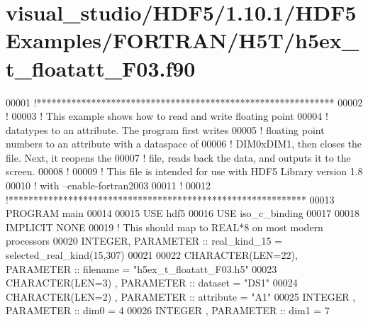 \hypertarget{visual__studio_2_h_d_f5_21_810_81_2_h_d_f5_examples_2_f_o_r_t_r_a_n_2_h5_t_2h5ex__t__floatatt___f03_8f90_source}{}\section{visual\+\_\+studio/\+H\+D\+F5/1.10.1/\+H\+D\+F5\+Examples/\+F\+O\+R\+T\+R\+A\+N/\+H5\+T/h5ex\+\_\+t\+\_\+floatatt\+\_\+\+F03.f90}
\label{visual__studio_2_h_d_f5_21_810_81_2_h_d_f5_examples_2_f_o_r_t_r_a_n_2_h5_t_2h5ex__t__floatatt___f03_8f90_source}

\begin{DoxyCode}
00001 \textcolor{comment}{!************************************************************}
00002 \textcolor{comment}{!}
00003 \textcolor{comment}{!  This example shows how to read and write floating point}
00004 \textcolor{comment}{!  datatypes to an attribute.  The program first writes}
00005 \textcolor{comment}{!  floating point numbers to an attribute with a dataspace of}
00006 \textcolor{comment}{!  DIM0xDIM1, then closes the file.  Next, it reopens the}
00007 \textcolor{comment}{!  file, reads back the data, and outputs it to the screen.}
00008 \textcolor{comment}{!}
00009 \textcolor{comment}{!  This file is intended for use with HDF5 Library version 1.8}
00010 \textcolor{comment}{!  with --enable-fortran2003}
00011 \textcolor{comment}{!}
00012 \textcolor{comment}{!************************************************************}
00013 \textcolor{keyword}{PROGRAM} main
00014 
00015   \textcolor{keywordtype}{USE }hdf5
00016   \textcolor{keywordtype}{USE }iso\_c\_binding
00017 
00018   \textcolor{keywordtype}{IMPLICIT NONE}
00019   \textcolor{comment}{! This should map to REAL*8 on most modern processors}
00020   \textcolor{keywordtype}{INTEGER}, \textcolor{keywordtype}{PARAMETER} :: real\_kind\_15 = selected\_real\_kind(15,307)
00021 
00022   \textcolor{keywordtype}{CHARACTER(LEN=22)}, \textcolor{keywordtype}{PARAMETER} :: filename  = \textcolor{stringliteral}{"h5ex\_t\_floatatt\_F03.h5"}
00023   \textcolor{keywordtype}{CHARACTER(LEN=3)} , \textcolor{keywordtype}{PARAMETER} :: dataset   = \textcolor{stringliteral}{"DS1"}
00024   \textcolor{keywordtype}{CHARACTER(LEN=2)} , \textcolor{keywordtype}{PARAMETER} :: attribute = \textcolor{stringliteral}{"A1"}
00025   \textcolor{keywordtype}{INTEGER}          , \textcolor{keywordtype}{PARAMETER} :: dim0      = 4
00026   \textcolor{keywordtype}{INTEGER}          , \textcolor{keywordtype}{PARAMETER} :: dim1      = 7

\end{DoxyCode}
